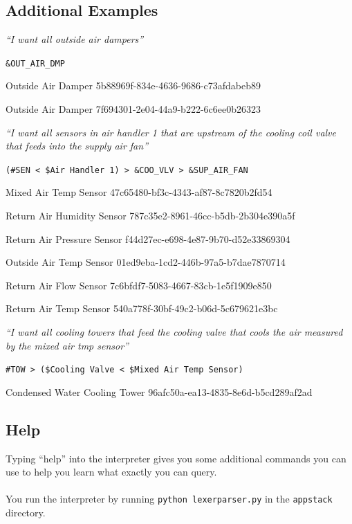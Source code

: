 \subsection{Additional Examples} %
\label{sub:additional_examples}

\begin{center}\emph{``I want all outside air dampers''}
	
	\verb+&OUT_AIR_DMP+
	
	Outside Air Damper 5b88969f-834e-4636-9686-c73afdabeb89
	
	Outside Air Damper 7f694301-2e04-44a9-b222-6c6ee0b26323
\end{center}

\begin{center}\emph{``I want all sensors in air handler 1 that are upstream of the cooling coil valve that feeds into the supply air fan''}
	
	\verb+(#SEN < $Air Handler 1) > &COO_VLV > &SUP_AIR_FAN+
	
	Mixed Air Temp Sensor 47c65480-bf3c-4343-af87-8c7820b2fd54
	
	Return Air Humidity Sensor 787c35e2-8961-46cc-b5db-2b304e390a5f
	
	Return Air Pressure Sensor f44d27ec-e698-4e87-9b70-d52e33869304
	
	Outside Air Temp Sensor 01ed9eba-1cd2-446b-97a5-b7dae7870714
	
	Return Air Flow Sensor 7c6bfdf7-5083-4667-83cb-1e5f1909e850

	Return Air Temp Sensor 540a778f-30bf-49c2-b06d-5c679621e3bc
\end{center}

\begin{center}\emph{``I want all cooling towers that feed the cooling valve that cools the air measured by the mixed air tmp sensor''}
	
	\verb+#TOW > ($Cooling Valve < $Mixed Air Temp Sensor)+
	
	Condensed Water Cooling Tower 96afc50a-ea13-4835-8e6d-b5cd289af2ad
\end{center}

\subsection{Help} %
\label{sub:help}
Typing ``help'' into the interpreter gives you some additional commands you can use to help you learn what exactly you can query.
\\\\
You run the interpreter by running \verb+python lexerparser.py+ in the \verb+appstack+ directory.

